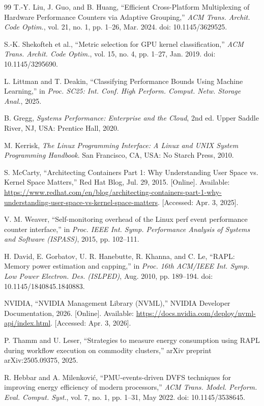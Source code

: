 \documentclass[12pt,oneside,spanish]{book}
\begin{document}
\begin{sloppypar}
\begin{thebibliography}{99}
 T.-Y. Liu, J. Guo, and B. Huang, ``Efficient Cross-Platform Multiplexing of Hardware Performance Counters via Adaptive Grouping,'' \textit{ACM Trans. Archit. Code Optim.}, vol. 21, no. 1, pp. 1--26, Mar. 2024. doi: 10.1145/3629525.

 S.-K. Shekofteh et al., ``Metric selection for GPU kernel classification,'' \textit{ACM Trans. Archit. Code Optim.}, vol. 15, no. 4, pp. 1--27, Jan. 2019. doi: 10.1145/3295690.

 L. Littman and T. Deakin, ``Classifying Performance Bounds Using Machine Learning,'' in \textit{Proc. SC25: Int. Conf. High Perform. Comput. Netw. Storage Anal.}, 2025.

 B. Gregg, \textit{Systems Performance: Enterprise and the Cloud}, 2nd ed. Upper Saddle River, NJ, USA: Prentice Hall, 2020.

 M. Kerrisk, \textit{The Linux Programming Interface: A Linux and UNIX System Programming Handbook}. San Francisco, CA, USA: No Starch Press, 2010.

 S. McCarty, ``Architecting Containers Part 1: Why Understanding User Space vs. Kernel Space Matters,'' Red Hat Blog, Jul. 29, 2015. [Online]. Available: \url{https://www.redhat.com/en/blog/architecting-containers-part-1-why-understanding-user-space-vs-kernel-space-matters}. [Accessed: Apr. 3, 2025].

 V. M. Weaver, ``Self-monitoring overhead of the Linux perf event performance counter interface,'' in \textit{Proc. IEEE Int. Symp. Performance Analysis of Systems and Software (ISPASS)}, 2015, pp. 102--111.

 H. David, E. Gorbatov, U. R. Hanebutte, R. Khanna, and C. Le, ``RAPL: Memory power estimation and capping,'' in \textit{Proc. 16th ACM/IEEE Int. Symp. Low Power Electron. Des. (ISLPED)}, Aug. 2010, pp. 189--194. doi: 10.1145/1840845.1840883.

 NVIDIA, ``NVIDIA Management Library (NVML),'' NVIDIA Developer Documentation, 2026. [Online]. Available: \url{https://docs.nvidia.com/deploy/nvml-api/index.html}. [Accessed: Apr. 3, 2026].

 P. Thamm and U. Leser, ``Strategies to measure energy consumption using RAPL during workflow execution on commodity clusters,'' arXiv preprint arXiv:2505.09375, 2025.

 R. Hebbar and A. Milenković, ``PMU-events-driven DVFS techniques for improving energy efficiency of modern processors,'' \textit{ACM Trans. Model. Perform. Eval. Comput. Syst.}, vol. 7, no. 1, pp. 1--31, May 2022. doi: 10.1145/3538645.


\end{thebibliography}
\end{sloppypar}
\end{document}
